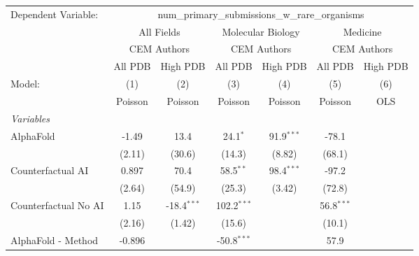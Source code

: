 \begingroup
\centering
\begin{tabular}{lcccccc}
   \tabularnewline \midrule \midrule
   Dependent Variable: & \multicolumn{6}{c}{num\_primary\_submissions\_w\_rare\_organisms}\\
 & \multicolumn{2}{c}{All Fields} & \multicolumn{2}{c}{Molecular Biology} & \multicolumn{2}{c}{Medicine} \\
\cmidrule(lr){2-3} \cmidrule(lr){4-5} \cmidrule(lr){6-7}
 & \multicolumn{2}{c}{CEM Authors} & \multicolumn{2}{c}{CEM Authors} & \multicolumn{2}{c}{CEM Authors} \\
\cmidrule(lr){2-3} \cmidrule(lr){4-5} \cmidrule(lr){6-7}
 & \multicolumn{1}{c}{All PDB} & \multicolumn{1}{c}{High PDB} & \multicolumn{1}{c}{All PDB} & \multicolumn{1}{c}{High PDB} & \multicolumn{1}{c}{All PDB} & \multicolumn{1}{c}{High PDB} \\
\cmidrule(lr){2-2} \cmidrule(lr){3-3} \cmidrule(lr){4-4} \cmidrule(lr){5-5} \cmidrule(lr){6-6} \cmidrule(lr){7-7}
   Model:                                                     & (1)       & (2)           & (3)            & (4)          & (5)          & (6)\\  
                                                              &  Poisson  & Poisson       & Poisson        & Poisson      & Poisson      & OLS\\  
   \midrule
   \emph{Variables}\\
   AlphaFold                                                  & -1.49     & 13.4          & 24.1$^{*}$     & 91.9$^{***}$ & -78.1        &   \\   
                                                              & (2.11)    & (30.6)        & (14.3)         & (8.82)       & (68.1)       &   \\   
   Counterfactual AI                                          & 0.897     & 70.4          & 58.5$^{**}$    & 98.4$^{***}$ & -97.2        &   \\   
                                                              & (2.64)    & (54.9)        & (25.3)         & (3.42)       & (72.8)       &   \\   
   Counterfactual No AI                                       & 1.15      & -18.4$^{***}$ & 102.2$^{***}$  &              & 56.8$^{***}$ &   \\   
                                                              & (2.16)    & (1.42)        & (15.6)         &              & (10.1)       &   \\   
   AlphaFold - Method                                         & -0.896    &               & -50.8$^{***}$  &              & 57.9         &   \\   

\end{tabular}
